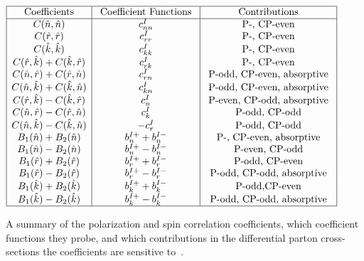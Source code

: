 \begin{table}[!h]
\begin{center}
\begin{math}
\begin{array}{|c|c|c|}
\hline 
\text { Coefficients } & \text { Coefficient Functions } & \text { Contributions } \\
\hline 
C(\hat{n},\hat{n}) & c_{n n}^I & \text { P-, CP-even } \\
C(\hat{r},\hat{r}) & c_{r r}^I & \text { P-, CP-even } \\
C(\hat{k},\hat{k}) & c_{k k}^I & \text { P-, CP-even } \\
C(\hat{r},\hat{k})+C(\hat{k},\hat{r}) & c_{r k}^I & \text { P-, CP-even } \\
C(\hat{n},\hat{r})+C(\hat{r},\hat{n}) & c_{r n}^I & \text { P-odd, CP-even, absorptive } \\
C(\hat{n},\hat{k})+C(\hat{k},\hat{n}) & c_{k n}^I & \text { P-odd, CP-even, absorptive } \\
C(\hat{r},\hat{k})-C(\hat{k},\hat{r}) & c_n^I & \text { P-even, CP-odd, absorptive } \\
C(\hat{n},\hat{r})-C(\hat{r},\hat{n}) & c_k^I & \text { P-odd, CP-odd } \\
C(\hat{n},\hat{k})-C(\hat{k},\hat{n}) & -c_r^I & \text { P-odd, CP-odd } \\
B_1(\hat{n})+B_2(\hat{n}) & b_n^{I+}+b_n^{I-} & \text { P-, CP-even, absorptive } \\
B_1(\hat{n})-B_2(\hat{n}) & b_n^{I+}-b_n^{I-} & \text { P-even, CP-odd } \\
B_1(\hat{r})+B_2(\hat{r}) & b_r^{I+}+b_r^{I-} & \text { P-odd, CP-even } \\
B_1(\hat{r})-B_2(\hat{r}) & b_r^{I+}-b_r^{I-} & \text { P-odd, CP-odd, absorptive } \\
B_1(\hat{k})+B_2(\hat{k}) & b_k^{I+}+b_k^{I-} & \text { P-odd,CP-even } \\
B_1(\hat{k})-B_2(\hat{k}) & b_k^{I+}-b_k^{I-} & \text { P-odd, CP-odd, absorptive } \\
\hline
\end{array}
\end{math}
\caption{A summary of the polarization and spin correlation coefficients, which coefficient functions they probe, and which contributions in the differential parton cross-sections the coefficients are sensitive to~\cite{Bernreuther}. 
        }
\label{coefficients_sensitive}
\end{center}
\end{table}

